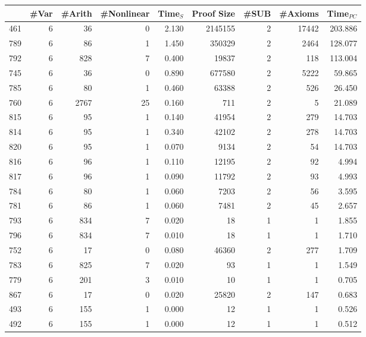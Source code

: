 \begin{table}[h]
  \begin{center}
    \begin{tabular}{l||r|r|r|r||r|r|r|r}
          & \#Var & \#Arith & \#Nonlinear & Time$_{S}$ & Proof Size & \#SUB & \#Axioms & Time$_{PC}$ \\
      \hline
      \hline
      461 & 6 & 36 & 0 & 2.130 & 2145155 & 2 & 17442 & 203.886 \\
      789 & 6 & 86 & 1 & 1.450 & 350329 & 2 & 2464 & 128.077 \\
      792 & 6 & 828 & 7 & 0.400 & 19837 & 2 & 118 & 113.004 \\
      745 & 6 & 36 & 0 & 0.890 & 677580 & 2 & 5222 & 59.865 \\
      785 & 6 & 80 & 1 & 0.460 & 63388 & 2 & 526 & 26.450 \\
      760 & 6 & 2767 & 25 & 0.160 & 711 & 2 & 5 & 21.089 \\
      815 & 6 & 95 & 1 & 0.140 & 41954 & 2 & 279 & 14.703 \\
      814 & 6 & 95 & 1 & 0.340 & 42102 & 2 & 278 & 14.703 \\
      820 & 6 & 95 & 1 & 0.070 & 9134 & 2 & 54 & 14.703 \\
      816 & 6 & 96 & 1 & 0.110 & 12195 & 2 & 92 & 4.994 \\
      817 & 6 & 96 & 1 & 0.090 & 11792 & 2 & 93 & 4.993 \\
      784 & 6 & 80 & 1 & 0.060 & 7203 & 2 & 56 & 3.595 \\
      781 & 6 & 86 & 1 & 0.060 & 7481 & 2 & 45 & 2.657 \\
      793 & 6 & 834 & 7 & 0.020 & 18 & 1 & 1 & 1.855 \\
      796 & 6 & 834 & 7 & 0.010 & 18 & 1 & 1 & 1.710 \\
      752 & 6 & 17 & 0 & 0.080 & 46360 & 2 & 277 & 1.709 \\
      783 & 6 & 825 & 7 & 0.020 & 93 & 1 & 1 & 1.549 \\
      779 & 6 & 201 & 3 & 0.010 & 10 & 1 & 1 & 0.705 \\
      867 & 6 & 17 & 0 & 0.020 & 25820 & 2 & 147 & 0.683 \\
      493 & 6 & 155 & 1 & 0.000 & 12 & 1 & 1 & 0.526 \\
      492 & 6 & 155 & 1 & 0.000 & 12 & 1 & 1 & 0.512

\end{tabular}
\end{center}
\end{table}
